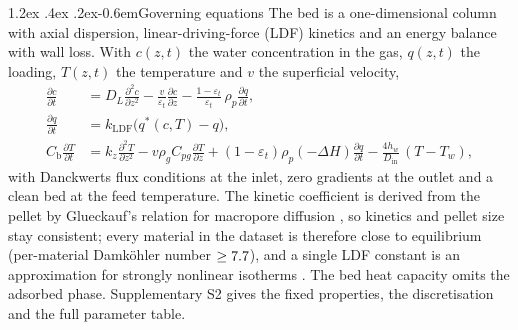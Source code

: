 \documentclass[10pt,a4paper]{article}
\makeatletter
\renewcommand\paragraph{\@startsection{paragraph}{4}{\z@}%
  {1.2ex \@plus .4ex \@minus .2ex}{-0.6em}{\normalfont\normalsize\bfseries}}
\makeatother
\begin{document}
\paragraph{Governing equations} The bed is a one-dimensional column with axial
dispersion, linear-driving-force (LDF) kinetics and an energy balance with wall loss.
With \(c(z,t)\) the water concentration in the gas, \(q(z,t)\) the loading, \(T(z,t)\)
the temperature and \(v\) the superficial velocity,
\begin{align}
\frac{\partial c}{\partial t} &= D_L \frac{\partial^2 c}{\partial z^2}
 - \frac{v}{\varepsilon_t}\frac{\partial c}{\partial z}
 - \frac{1-\varepsilon_t}{\varepsilon_t}\,\rho_p \frac{\partial q}{\partial t},
\label{eq:mass}\\
\frac{\partial q}{\partial t} &= k_{\mathrm{LDF}}\bigl(q^{*}(c,T) - q\bigr),
\label{eq:ldf}\\
C_{\mathrm{b}}\frac{\partial T}{\partial t} &= k_z \frac{\partial^2 T}{\partial z^2}
 - v\rho_g C_{pg}\frac{\partial T}{\partial z}
 + (1-\varepsilon_t)\rho_p(-\Delta H)\frac{\partial q}{\partial t}
 - \frac{4h_w}{D_{\mathrm{in}}}\,(T - T_w),
\label{eq:energy}
\end{align}
with Danckwerts flux conditions at the inlet, zero gradients at the outlet and a clean
bed at the feed temperature. The kinetic coefficient is derived from the pellet by
Glueckauf's relation for macropore diffusion \cite{glueckauf1947theory,glueckauf1955theory},
so kinetics and pellet size stay consistent; every material in the dataset is therefore
close to equilibrium (per-material Damk\"ohler number \(\geq 7.7\)), and a single
LDF constant is an approximation for strongly nonlinear isotherms \cite{sircar2000why}.
The bed heat capacity omits the adsorbed phase. Supplementary S2 gives the fixed
properties, the discretisation and the full parameter table.
\end{document}
